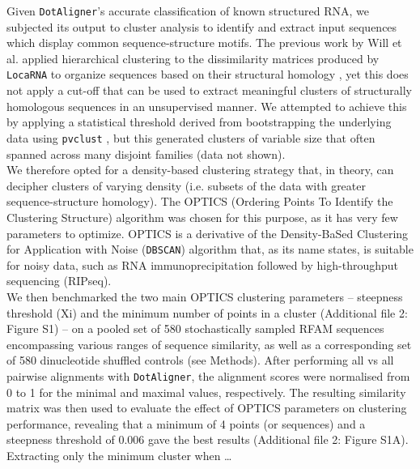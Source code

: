 \documentclass{bmcart}
\newcommand\dotaligner{\texttt{DotAligner}}
\newcommand\locarna{\texttt{LocaRNA}}
\begin{document}
Given \dotaligner{}'s accurate classification of known structured RNA, we subjected its
output to cluster analysis to identify and extract input sequences which display common
sequence-structure motifs. The previous work by Will et al. applied hierarchical clustering 
to the dissimilarity matrices produced by \locarna{} to organize sequences based on their
structural homology \cite{Will17432929}, yet this does not apply a cut-off that can be used 
to extract meaningful clusters of structurally homologous sequences in an unsupervised 
manner. We attempted to achieve this by applying a statistical threshold derived from 
bootstrapping the underlying data using \texttt{pvclust} \cite{suzuki2006pvclust}, but this
generated clusters of variable size that often spanned across many disjoint families 
(data not shown).\\

We therefore opted for a density-based clustering strategy that, in theory, can decipher 
clusters of varying density (i.e. subsets of the data with greater sequence-structure homology). 
The OPTICS (Ordering Points To Identify the Clustering Structure) algorithm \cite{ankerst99ordering}
was chosen for this purpose, as it has very few parameters to optimize. 
OPTICS is a derivative of the Density-BaSed Clustering for Application with Noise
 (\texttt{DBSCAN}) \cite{ester1996density} algorithm that, as its name states, is suitable 
 for noisy data, such as RNA immunoprecipitation followed by high-throughput sequencing 
 (RIPseq).\\

We then benchmarked the two main OPTICS clustering parameters -- steepness
threshold (Xi) and the minimum number of points in a cluster (Additional file 2:
Figure S1) -- on a pooled set of 580 stochastically sampled RFAM sequences
encompassing various ranges of sequence similarity, as well as a corresponding
set of 580 dinucleotide shuffled controls (see Methods).  After performing all
vs all pairwise alignments with \dotaligner{}, the alignment scores were
normalised from 0 to 1 for the minimal and maximal values, respectively.  The
resulting similarity matrix was then used to evaluate the effect of OPTICS
parameters on clustering performance, revealing that a minimum of 4 points (or
sequences) and a steepness threshold of 0.006 gave the best results (Additional
file 2: Figure S1A).  {\color{red} Extracting only the minimum cluster when
\ldots} \\
\end{document}
